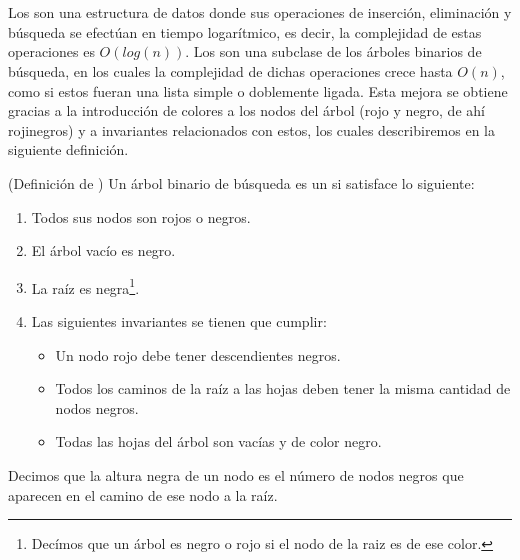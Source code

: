 \section{\Arns}
Los {\arns} son una estructura de datos donde sus operaciones de inserci\'on, eliminaci\'on y
búsqueda se efectúan en tiempo logarítmico, es decir, la complejidad de estas operaciones es
$O(log(n))$. Los {\arns} son una subclase de los \'arboles binarios de búsqueda, en los cuales la
complejidad de dichas operaciones crece hasta $O(n)$, como si estos fueran una lista simple o
doblemente ligada. Esta mejora se obtiene gracias a la introducción de colores a los nodos del
\'arbol (rojo y negro, de ah\'i rojinegros) y a invariantes relacionados con estos, los
cuales describiremos en la siguiente definici\'on.
\begin{defn}{(Definici\'on de {\arns})}
\label{defn_arn}
Un \'arbol binario de búsqueda es un {\arn} si satisface lo siguiente:
\begin{enumerate}
    \item Todos sus nodos son rojos o negros.
    \item El \'arbol vac\'io es negro.
    \item La ra\'iz es negra\footnote{Dec\'imos que un \'arbol es negro o rojo si el nodo de la
    raiz es de ese color.}.
    \item Las siguientes invariantes se tienen que cumplir:
    \begin{itemize}
        \item Un nodo rojo debe tener descendientes negros.
        \item Todos los caminos de la raíz a las hojas deben tener la misma cantidad de nodos
        negros.
        \item Todas las hojas del \'arbol son vacías y de color negro.
    \end{itemize}
\end{enumerate}
Decimos que la altura negra de un nodo es el n\'umero de nodos negros que aparecen en el camino de 
ese nodo a la raíz.
\end{defn}


